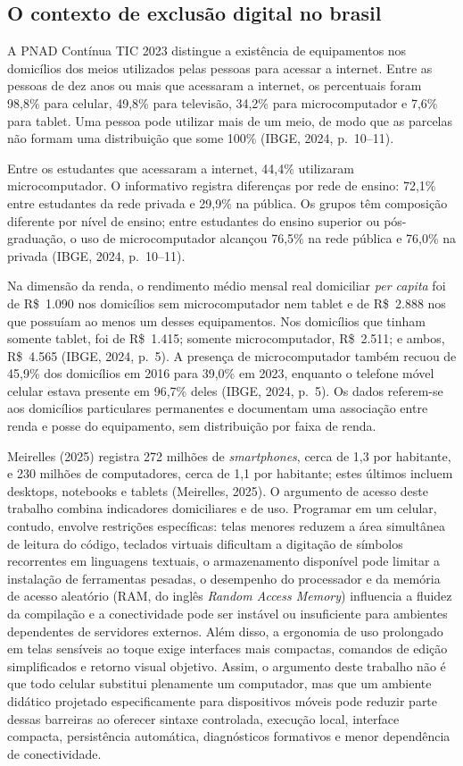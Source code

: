 \documentclass[
    12pt
    ,oneside
    ,a4paper
    ,chapter=TITLE
    ,section=TITLE
    ,sumario=abnt-6027-2012]{abntex2}
\newcommand{\citeFgv}{(Meirelles, 2025)}
\begin{document}
\subsection{O contexto de exclusão digital no brasil}
\label{sec:acesso_equipamentos}

A PNAD Contínua TIC 2023 distingue a existência de equipamentos nos domicílios
dos meios utilizados pelas pessoas para acessar a internet. Entre as pessoas de
dez anos ou mais que acessaram a internet, os percentuais foram 98,8\% para celular,
49,8\% para televisão, 34,2\% para microcomputador e 7,6\% para tablet. Uma pessoa
pode utilizar mais de um meio, de modo que as parcelas não formam uma distribuição
que some 100\% (IBGE, 2024, p.~10--11).

Entre os estudantes que acessaram a internet, 44,4\% utilizaram microcomputador.
O informativo registra diferenças por rede de ensino: 72,1\% entre estudantes da
rede privada e 29,9\% na pública. Os grupos têm composição diferente por nível de
ensino; entre estudantes do ensino superior ou pós-graduação, o uso de microcomputador
alcançou 76,5\% na rede pública e 76,0\% na privada (IBGE, 2024, p.~10--11).


Na dimensão da renda, o rendimento médio mensal real domiciliar \textit{per capita}
foi de R\$~1.090 nos domicílios sem microcomputador nem tablet e de R\$~2.888 nos
que possuíam ao menos um desses equipamentos. Nos domicílios que tinham somente
tablet, foi de R\$~1.415; somente microcomputador, R\$~2.511; e ambos, R\$~4.565
(IBGE, 2024, p.~5). A presença de microcomputador também recuou de 45,9\% dos
domicílios em 2016 para 39,0\% em 2023, enquanto o telefone móvel celular estava
presente em 96,7\% deles (IBGE, 2024, p.~5). Os dados referem-se aos domicílios
particulares permanentes e documentam uma associação entre renda e posse do
equipamento, sem distribuição por faixa de renda.

Meirelles (2025) registra 272 milhões de \textit{smartphones}, cerca de 1,3 por
habitante, e 230 milhões de computadores, cerca de 1,1 por habitante; estes últimos
incluem desktops, notebooks e tablets \citeFgv. O argumento de acesso deste trabalho combina indicadores domiciliares e de uso. Programar em um celular, contudo, envolve restrições específicas: telas
menores reduzem a área simultânea de leitura do código, teclados virtuais dificultam a digitação
de símbolos recorrentes em linguagens textuais, o armazenamento disponível pode limitar a
instalação de ferramentas pesadas, o desempenho do processador e da memória de acesso aleatório (RAM, do inglês \textit{Random Access Memory}) influencia a
fluidez da compilação e a conectividade pode ser instável ou insuficiente para ambientes
dependentes de servidores externos. Além disso, a ergonomia de uso prolongado em telas sensíveis
ao toque exige interfaces mais compactas, comandos de edição simplificados e retorno visual
objetivo. Assim, o argumento deste trabalho não é que todo celular substitui plenamente um
computador, mas que um ambiente didático projetado especificamente para dispositivos móveis pode
reduzir parte dessas barreiras ao oferecer sintaxe controlada, execução local, interface compacta,
persistência automática, diagnósticos formativos e menor dependência de conectividade.
\end{document}
